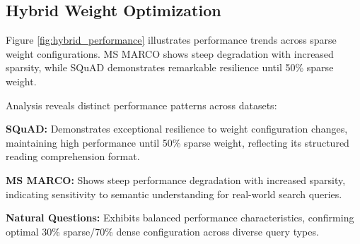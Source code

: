 \documentclass[conference]{IEEEtran}
\begin{document}
\subsection{Hybrid Weight Optimization}

Figure \ref{fig:hybrid_performance} illustrates performance trends across sparse weight configurations. MS MARCO shows steep degradation with increased sparsity, while SQuAD demonstrates remarkable resilience until 50\% sparse weight.

Analysis reveals distinct performance patterns across datasets:

\textbf{SQuAD:} Demonstrates exceptional resilience to weight configuration changes, maintaining high performance until 50\% sparse weight, reflecting its structured reading comprehension format.

\textbf{MS MARCO:} Shows steep performance degradation with increased sparsity, indicating sensitivity to semantic understanding for real-world search queries.

\textbf{Natural Questions:} Exhibits balanced performance characteristics, confirming optimal 30\% sparse/70\% dense configuration across diverse query types.
\end{document}
